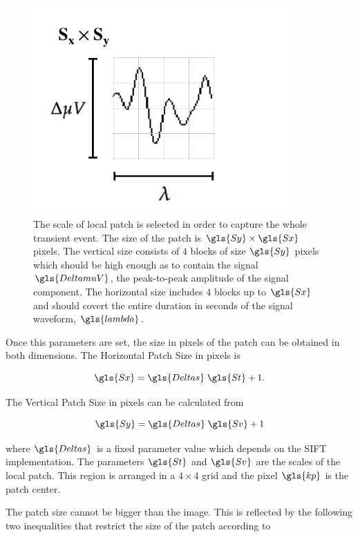 \begin{figure}[h!]
\centering
\includegraphics[width=10cm]{images/patchgeometry.pdf}
\caption[Patch Geometry]{The scale of local patch is selected in order to capture the whole transient event.  The size of the patch is $\gls{Sy} \times \gls{Sx}$ pixels. The vertical size consists of $4$ blocks of size $\gls{Sy}$ pixels which should be high enough as to contain the signal $\gls{DeltamuV}$, the peak-to-peak amplitude of the signal component. The horizontal size includes $4$ blocks up to $\gls{Sx}$ and should covert the entire duration in seconds of the signal waveform, $ \gls{lambda} $.   }
\label{fig:patchgeometry}
\end{figure}

Once this parameters are set, the size in pixels of the patch can be obtained in both dimensions.  The Horizontal Patch Size in pixels is

\begin{equation}
\gls{Sx} = \gls{Deltas} \; \gls{St} + 1.
\label{eq:sx}
\end{equation}

The Vertical Patch Size in pixels can be calculated from

\begin{equation}
\gls{Sy} = \gls{Deltas} \; \gls{Sv} + 1
\label{eq:sy}
\end{equation}

\noindent where $\gls{Deltas}$ is a fixed parameter value which depends on the SIFT implementation. The parameters $\gls{St}$  and $\gls{Sv}$ are the scales of the local patch. This region is arranged in a $4 \times 4$ grid and the pixel $\gls{kp}$ is the patch center. 

The patch size cannot be bigger than the image.  This is reflected by the following two inequalities that restrict the size of the patch according to 

